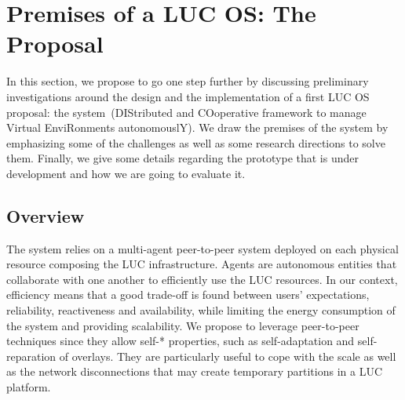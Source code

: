 \section{Premises of a LUC OS: The \discovery Proposal\label{sec:archi}}

In this section, we propose to go one step further by discussing preliminary
investigations around the design and the implementation of a first LUC OS
proposal: the \discovery system~(DIStributed and COoperative framework to manage
Virtual EnviRonments autonomouslY). We draw the premises of the \discovery
system by emphasizing some of the challenges as well as some research directions
to solve them. Finally, we give some details regarding the prototype that is
under development and how we are going to evaluate it.  

\subsection{Overview}

The \discovery system relies on a multi-agent peer-to-peer system deployed on
each physical resource composing the LUC infrastructure. Agents are autonomous
entities that collaborate with one another to efficiently use the LUC resources. In our context,
efficiency means that a good trade-off is found between users'
expectations, reliability, reactiveness and availability,
while limiting the energy consumption of the system and providing
scalability. We propose to leverage peer-to-peer techniques since they
allow self-* properties, such as self-adaptation and self-reparation of overlays.
They are particularly useful to cope with the scale as well as the
network disconnections that may create temporary partitions in a LUC platform.



